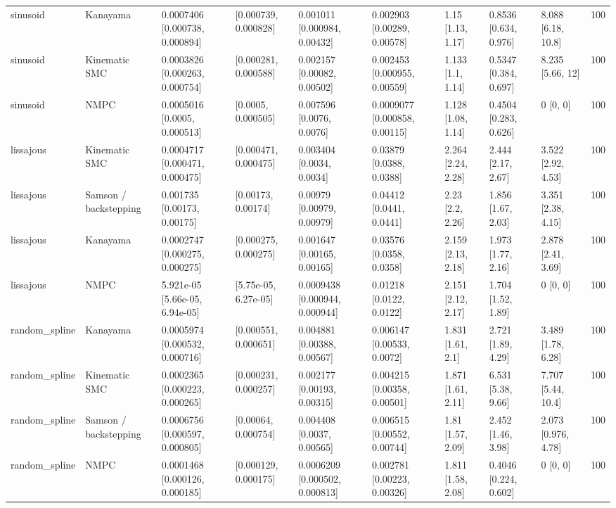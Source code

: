 \begin{table}
\begin{tabular}{llllllllll}
sinusoid & Kanayama & 0.0007406 [0.000738, 0.000894] & [0.000739, 0.000828] & 0.001011 [0.000984, 0.00432] & 0.002903 [0.00289, 0.00578] & 1.15 [1.13, 1.17] & 0.8536 [0.634, 0.976] & 8.088 [6.18, 10.8] & 100 \\
sinusoid & Kinematic SMC & 0.0003826 [0.000263, 0.000754] & [0.000281, 0.000588] & 0.002157 [0.00082, 0.00502] & 0.002453 [0.000955, 0.00559] & 1.133 [1.1, 1.14] & 0.5347 [0.384, 0.697] & 8.235 [5.66, 12] & 100 \\
sinusoid & NMPC & 0.0005016 [0.0005, 0.000513] & [0.0005, 0.000505] & 0.007596 [0.0076, 0.0076] & 0.0009077 [0.000858, 0.00115] & 1.128 [1.08, 1.14] & 0.4504 [0.283, 0.626] & 0 [0, 0] & 100 \\
lissajous & Kinematic SMC & 0.0004717 [0.000471, 0.000475] & [0.000471, 0.000475] & 0.003404 [0.0034, 0.0034] & 0.03879 [0.0388, 0.0388] & 2.264 [2.24, 2.28] & 2.444 [2.17, 2.67] & 3.522 [2.92, 4.53] & 100 \\
lissajous & Samson / backstepping & 0.001735 [0.00173, 0.00175] & [0.00173, 0.00174] & 0.00979 [0.00979, 0.00979] & 0.04412 [0.0441, 0.0441] & 2.23 [2.2, 2.26] & 1.856 [1.67, 2.03] & 3.351 [2.38, 4.15] & 100 \\
lissajous & Kanayama & 0.0002747 [0.000275, 0.000275] & [0.000275, 0.000275] & 0.001647 [0.00165, 0.00165] & 0.03576 [0.0358, 0.0358] & 2.159 [2.13, 2.18] & 1.973 [1.77, 2.16] & 2.878 [2.41, 3.69] & 100 \\
lissajous & NMPC & 5.921e-05 [5.66e-05, 6.94e-05] & [5.75e-05, 6.27e-05] & 0.0009438 [0.000944, 0.000944] & 0.01218 [0.0122, 0.0122] & 2.151 [2.12, 2.17] & 1.704 [1.52, 1.89] & 0 [0, 0] & 100 \\
random\_spline & Kanayama & 0.0005974 [0.000532, 0.000716] & [0.000551, 0.000651] & 0.004881 [0.00388, 0.00567] & 0.006147 [0.00533, 0.0072] & 1.831 [1.61, 2.1] & 2.721 [1.89, 4.29] & 3.489 [1.78, 6.28] & 100 \\
random\_spline & Kinematic SMC & 0.0002365 [0.000223, 0.000265] & [0.000231, 0.000257] & 0.002177 [0.00193, 0.00315] & 0.004215 [0.00358, 0.00501] & 1.871 [1.61, 2.11] & 6.531 [5.38, 9.66] & 7.707 [5.44, 10.4] & 100 \\
random\_spline & Samson / backstepping & 0.0006756 [0.000597, 0.000805] & [0.00064, 0.000754] & 0.004408 [0.0037, 0.00565] & 0.006515 [0.00552, 0.00744] & 1.81 [1.57, 2.09] & 2.452 [1.46, 3.98] & 2.073 [0.976, 4.78] & 100 \\
random\_spline & NMPC & 0.0001468 [0.000126, 0.000185] & [0.000129, 0.000175] & 0.0006209 [0.000502, 0.000813] & 0.002781 [0.00223, 0.00326] & 1.811 [1.58, 2.08] & 0.4046 [0.224, 0.602] & 0 [0, 0] & 100 \\

\end{tabular}
\end{table}
